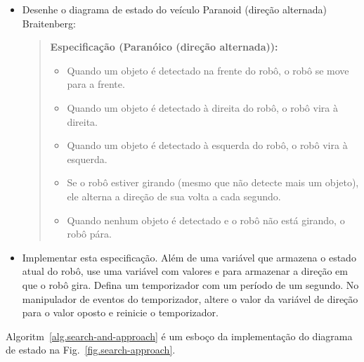 \begin{framed}
\begin{itemize}
\item Desenhe o diagrama de estado do veículo Paranoid (direção alternada) Braitenberg:
\begin{quote}
\normalsize\noindent\textbf{Especificação (Paranóico (direção alternada)):}
\begin{itemize}
\item Quando um objeto é detectado na frente do robô, o robô se move para a frente.
\item Quando um objeto é detectado à direita do robô, o robô vira à direita. 
\item Quando um objeto é detectado à esquerda do robô, o robô vira à esquerda. 
\item Se o robô estiver girando (mesmo que não detecte mais um objeto), ele alterna a direção de sua volta a cada segundo.
\item Quando nenhum objeto é detectado e o robô não está girando, o robô pára. 
\end{itemize}
\end{quote}
\item Implementar esta especificação. Além de uma variável que armazena o estado atual do robô, use uma variável com valores  e  para armazenar a direção em que o robô gira. Defina um temporizador com um período de um segundo. No manipulador de eventos do temporizador, altere o valor da variável de direção para o valor oposto e reinicie o temporizador.
\end{itemize}
\end{framed}

Algoritm~\ref{alg.search-and-approach} é um esboço da implementação do diagrama de estado na Fig.~\ref{fig.search-approach}.

